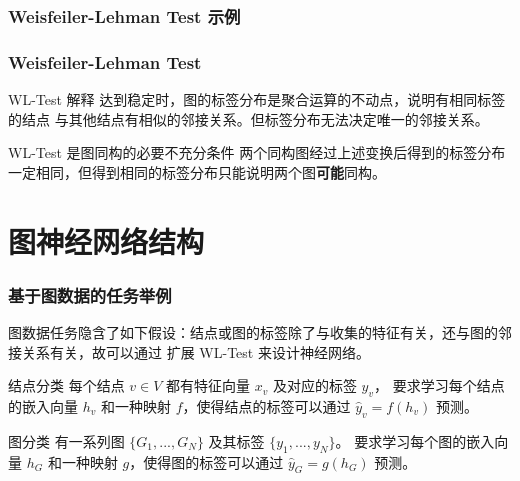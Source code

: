 \documentclass{beamer}
\begin{document}
\begin{frame}

  \frametitle{Weisfeiler-Lehman Test 示例}

\end{frame}

\begin{frame}

  \frametitle{Weisfeiler-Lehman Test}
  \begin{block}{WL-Test 解释}
    达到稳定时，图的标签分布是聚合运算的不动点，说明有相同标签的结点
    与其他结点有相似的邻接关系。但标签分布无法决定唯一的邻接关系。
  \end{block}
  \begin{alertblock}{WL-Test 是图同构的必要不充分条件}
    两个同构图经过上述变换后得到的标签分布一定相同，但得到相同的标签分布只能说明两个图\textbf{可能}同构。
  \end{alertblock}

\end{frame}

\section{图神经网络结构}

\begin{frame}

  \frametitle{基于图数据的任务举例}
  图数据任务隐含了如下假设：结点或图的标签除了与收集的特征有关，还与图的邻接关系有关，故可以通过
  扩展 WL-Test 来设计神经网络。
  \begin{block}{结点分类}
    每个结点 $v \in V$ 都有特征向量 $x_v$ 及对应的标签 $y_v$，
    要求学习每个结点的嵌入向量 $h_v$ 和一种映射 $f$，使得结点的标签可以通过 $\hat{y}_v = f(h_v)$ 预测。
  \end{block}
  \begin{block}{图分类}
    有一系列图 $\{G_1, ..., G_N\}$ 及其标签 $\{y_1, ..., y_N\}$。
    要求学习每个图的嵌入向量 $h_G$ 和一种映射 $g$，使得图的标签可以通过 $\hat{y}_G = g(h_G)$ 预测。
  \end{block}

\end{frame}
\end{document}
